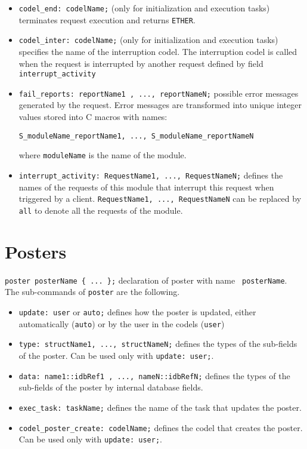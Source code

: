 \begin{itemize}
\item[]{\tt codel\_end:  codelName;} (only for initialization and execution
tasks) terminates request execution and returns {\tt ETHER}.

\item[]{\tt codel\_inter: codelName;} (only for initialization and execution
tasks) specifies the name of the interruption codel. The interruption
codel is called when the request is interrupted by another request
defined by field {\tt interrupt\_activity}\\

\item[]{\tt fail\_reports:  reportName1 , ..., reportNameN;}
possible error messages generated by the request. Error messages are
transformed into unique integer values stored into C macros with
names:
\begin{verbatim}
S_moduleName_reportName1, ..., S_moduleName_reportNameN
\end{verbatim}
where \texttt{moduleName} is the name of the module.

\item[]{\tt interrupt\_activity:	    RequestName1, ..., RequestNameN;}
defines the names of the requests of this module that interrupt this request when
triggered by a client. {\tt RequestName1, ..., RequestNameN} can be
replaced by {\tt all} to denote all the requests of the module.

\end{itemize}

\section{Posters}
\label{sec|posters}

{\tt poster posterName \{ ... \};} declaration of poster with name {\tt
  posterName}.\\

\noindent
The sub-commands of {\tt poster} are the following.

\begin{itemize}
\item[]{\tt update:  user} or {\tt auto;} defines how the poster is updated,
either automatically ({\tt auto}) or by the user in the codels ({\tt user})

\item[]{\tt type:  structName1, ..., structNameN;} defines the types of
the sub-fields of the poster. Can be used only with {\tt update:  user;}.

\item[]{\tt data:  name1::idbRef1 , ..., nameN::idbRefN;} defines the
types of the sub-fields of the poster by internal database fields.

\item[]{\tt exec\_task:  taskName;} defines the name of the task that updates
the poster.

\item[]{\tt codel\_poster\_create:  codelName;} defines the codel that creates
the poster. Can be used only with {\tt update:  user;}.
\end{itemize}

